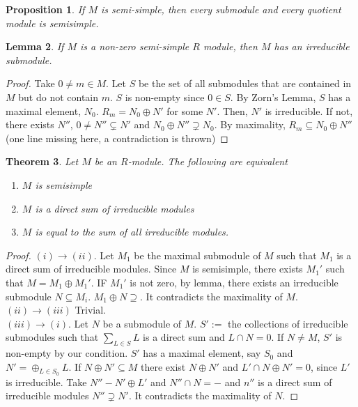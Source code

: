 \documentclass[letterpaper, leqno, 12pt]{article}
\theoremstyle{stdthm}
\newtheorem{thm}{Theorem}
\newtheorem{lem}[thm]{Lemma}
\newtheorem{prop}[thm]{Proposition}
\theoremstyle{stddef}
\theoremstyle{stdnonum}
\theoremstyle{stdqands}
\theoremstyle{stdbold}
\begin{document}
\begin{prop}
If $M$ is semi-simple, then every submodule and every quotient module is semisimple. 
\end{prop}

\begin{lem}
If $M$ is a non-zero semi-simple $R$ module, then $M$ has an irreducible submodule. 
\end{lem}

\begin{proof}
Take $0 \neq m \in M$. Let $S$ be the set of all submodules that are contained in $M$ but do not contain $m$. $S$ is non-empty since $0 \in S$. By Zorn's Lemma, $S$ has a maximal element, $N_0$. $R_m = N_0 \oplus N'$ for some $N'$. Then, $N'$ is irreducible. If not, there exists $N''$, $0 \neq N''\subsetneq N'$ and $N_0 \oplus N'' \supsetneq N_0$. By maximality, $R_m \subseteq N_0 \oplus N''$   (one line missing here, a contradiction is thrown)
\end{proof}

\begin{thm}
Let $M$ be an $R$-module. The following are equivalent
\begin{enumerate}
\item $M$ is semisimple
\item $M$ is a direct sum of irreducible modules
\item $M$ is equal to the sum of all irreducible modules. 
\end{enumerate}
\end{thm}

\begin{proof}
$(i) \rightarrow (ii)$. Let $M_1$ be the maximal submodule of $M$ such that $M_1$ is a direct sum of irreducible modules. Since $M$ is semisimple, there exists $M_1'$ such that $M= M_1 \oplus M_1'$. IF $M_1'$ is not zero, by lemma, there exists an irreducible submodule $N \subseteq M_i$.  $M_1 \oplus N \supseteq $. It contradicts the maximality of $M$. \\
\noindent $(ii) \rightarrow (iii)$ Trivial. \\

$(iii) \rightarrow (i)$. Let $N$ be a submodule of $M$. $S':=$ the collections of irreducible submodules such that $\sum_{L \in S} L$ is a direct sum and $L \cap N = 0$.  If $N \neq M$, $S'$ is non-empty by our condition. $S'$ has a maximal element, say $S_0$ and $N' = \oplus_{L \in S_0} L$. If $N \oplus N' \subseteq M$ there exist $N \oplus N'$  and $L' \cap N \oplus N' = 0$, since $L'$ is irreducible. Take $N'' - N' \oplus  L'$ and $N'' \cap N = -$ and $n''$ is a direct sum of irreducible modules $N'' \supsetneq N'$. It contradicts the maximality of $N$. 
\end{proof}
\end{document}
